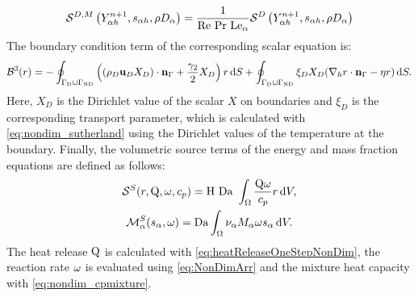 \begin{equation}
\mathcal{S}^{D,M}\left(Y^{n+1}_{\alpha h},s_{\alpha h},\rho D_\alpha\right) = \frac{1}{\text{Re}~\text{Pr}~\text{Le}_\alpha} \mathcal{S}^D\left(Y^{n+1}_{\alpha h},s_{\alpha h},\rho D_\alpha\right)
\end{equation}
The boundary condition term of the corresponding scalar equation is:
\begin{equation}
	\mathcal{B}^3(r) =  -
	\oint_{\Gamma_{\text{D}}\cup \Gamma_{\text{ND}}}{ \left( (\rho_D\textbf{u}_D X_D)\cdot \textbf{n}_{\Gamma} + \frac{\gamma_2}{2}X_D\right)r \,\mathrm{d} S}
	+\oint_{\Gamma_{\text{D}}\cup \Gamma_{\text{ND}}} \xi_D X_D(\nabla_h r \cdot \textbf{n}_{\Gamma} - \eta r )\,\mathrm{d} S.
\end{equation}
Here, $X_D$ is the Dirichlet value of the scalar $X$ on boundaries and $\xi_D$ is the corresponding transport parameter, which is calculated with \cref{eq:nondim_sutherland} using the Dirichlet values of the temperature at the boundary.
Finally, the volumetric source terms of the energy and mass fraction equations are defined as follows:
\begin{gather}
	\mathcal{S}^S(r,\mathrm{Q}, \omega,c_p) =  \text{H}~\text{Da} ~ \int_{\Omega}{ \frac{\mathrm{Q} \omega}{c_p} r} \,\mathrm{d} V, \\
	\mathcal{M}^S_\alpha(s_\alpha,\omega ) =  \text{Da} \int_{\Omega}{  \nu_\alpha M_\alpha \omega s_\alpha} \,\mathrm{d} V.
\end{gather}
The heat release $\mathrm{Q}$ is calculated with \cref{eq:heatReleaseOneStepNonDim}, the reaction rate $\omega$ is evaluated using \cref{eq:NonDimArr} and the mixture heat capacity with \cref{eq:nondim_cpmixture}.


